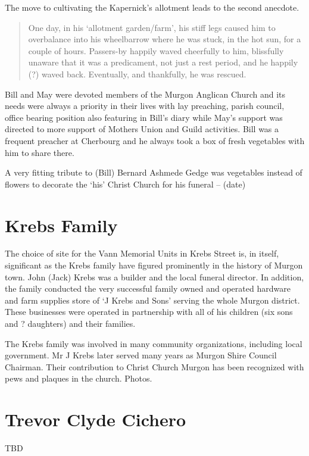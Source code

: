 The move to cultivating the Kapernick's allotment leads to the second
anecdote.

\begin{quote}
One day, in his `allotment garden/farm', his stiff legs caused him to
overbalance into his wheelbarrow where he was stuck, in the hot sun, for
a couple of hours. Passers-by happily waved cheerfully to him,
blissfully unaware that it was a predicament, not just a rest period,
and he happily (?) waved back. Eventually, and thankfully, he was
rescued.
\end{quote}

Bill and May were devoted members of the Murgon Anglican Church and its
needs were always a priority in their lives with lay preaching, parish
council, office bearing position also featuring in Bill's diary while
May's support was directed to more support of Mothers Union and Guild
activities. Bill was a frequent preacher at Cherbourg and he always took
a box of fresh vegetables with him to share there.

A very fitting tribute to (Bill) Bernard Ashmede Gedge was vegetables
instead of flowers to decorate the `his' Christ Church for his funeral
-- (date)

\section{Krebs Family}

The choice of site for the Vann Memorial Units in Krebs Street is, in
itself, significant as the Krebs family have figured prominently in the
history of Murgon town. John (Jack) Krebs was a builder and the local
funeral director. In addition, the family conducted the very successful
family owned and operated hardware and farm supplies store of `J Krebs
and Sons' serving the whole Murgon district. These businesses were
operated in partnership with all of his children (six sons and ?
daughters) and their families.

The Krebs family was involved in many community organizations, including
local government. Mr J Krebs later served many years as Murgon Shire
Council Chairman. Their contribution to Christ Church Murgon has been
recognized with pews and plaques in the church. Photos.

\section{Trevor Clyde Cichero}

TBD

